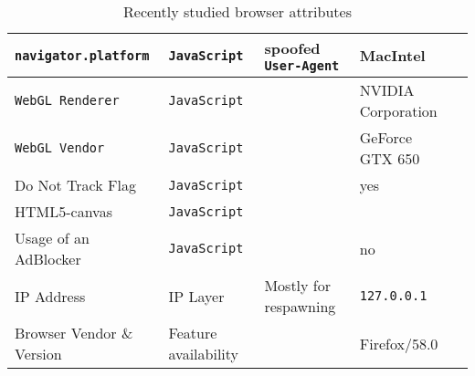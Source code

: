 \begin{table}[!h]
\begin{tabular}{|p{3.5cm}|p{2cm}|p{2cm}|p{3cm}|c|}
\texttt{navigator.platform} & \texttt{JavaScript} & spoofed \texttt{User-Agent}& MacIntel & \cite{laperdrix_beauty_2016,acar_fpdetective_2013} \\ \hline
\texttt{WebGL Renderer} & \texttt{JavaScript} & & NVIDIA Corporation \cite{laperdrix_beauty_2016} & \cite{laperdrix_beauty_2016,mowery_pixel_2012} \\\hline
\texttt{WebGL Vendor} & \texttt{JavaScript} & & GeForce GTX 650 \cite{laperdrix_beauty_2016} & \cite{laperdrix_beauty_2016,mowery_pixel_2012} \\\hline
Do Not Track Flag & \texttt{JavaScript} & & yes & \cite{laperdrix_beauty_2016} \\\hline
HTML5-canvas & \texttt{JavaScript} & & & \cite{laperdrix_beauty_2016,mowery_pixel_2012} \\\hline
Usage of an AdBlocker & \texttt{JavaScript} & & no \cite{laperdrix_beauty_2016} & \cite{laperdrix_beauty_2016} \\\hline
IP Address & IP Layer & Mostly for respawning & \texttt{127.0.0.1} & \cite{yen_host_2012} \\\hline
Browser Vendor \& Version & Feature availability & & Firefox/58.0 & \cite{nikiforakis_cookieless_2013} \\ \hline
\end{tabular}
\caption{Recently studied browser attributes}
\end{table}